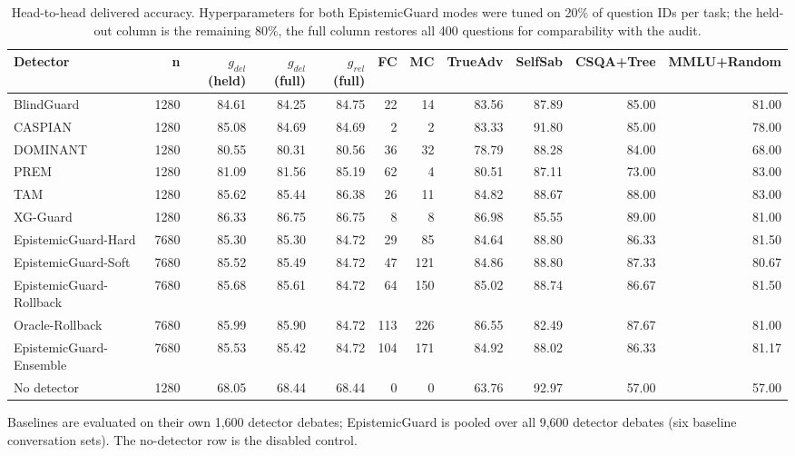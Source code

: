 \begin{table}[htbp]
\centering
\small
\caption{Head-to-head delivered accuracy. Hyperparameters for both EpistemicGuard modes were tuned on 20\% of question IDs per task; the held-out column is the remaining 80\%, the full column restores all 400 questions for comparability with the audit.}
\label{tab:leaderboard}
\begin{tabular}{lrrrrrrrrrr}
\toprule
Detector & n & $g_{del}$ (held) & $g_{del}$ (full) & $g_{rel}$ (full) & FC & MC & TrueAdv & SelfSab & CSQA+Tree & MMLU+Random \\
\midrule
BlindGuard & 1280 & 84.61 & 84.25 & 84.75 & 22 & 14 & 83.56 & 87.89 & 85.00 & 81.00 \\
CASPIAN & 1280 & 85.08 & 84.69 & 84.69 & 2 & 2 & 83.33 & 91.80 & 85.00 & 78.00 \\
DOMINANT & 1280 & 80.55 & 80.31 & 80.56 & 36 & 32 & 78.79 & 88.28 & 84.00 & 68.00 \\
PREM & 1280 & 81.09 & 81.56 & 85.19 & 62 & 4 & 80.51 & 87.11 & 73.00 & 83.00 \\
TAM & 1280 & 85.62 & 85.44 & 86.38 & 26 & 11 & 84.82 & 88.67 & 88.00 & 83.00 \\
XG-Guard & 1280 & 86.33 & 86.75 & 86.75 & 8 & 8 & 86.98 & 85.55 & 89.00 & 81.00 \\
EpistemicGuard-Hard & 7680 & 85.30 & 85.30 & 84.72 & 29 & 85 & 84.64 & 88.80 & 86.33 & 81.50 \\
EpistemicGuard-Soft & 7680 & 85.52 & 85.49 & 84.72 & 47 & 121 & 84.86 & 88.80 & 87.33 & 80.67 \\
EpistemicGuard-Rollback & 7680 & 85.68 & 85.61 & 84.72 & 64 & 150 & 85.02 & 88.74 & 86.67 & 81.50 \\
Oracle-Rollback & 7680 & 85.99 & 85.90 & 84.72 & 113 & 226 & 86.55 & 82.49 & 87.67 & 81.00 \\
EpistemicGuard-Ensemble & 7680 & 85.53 & 85.42 & 84.72 & 104 & 171 & 84.92 & 88.02 & 86.33 & 81.17 \\
No detector & 1280 & 68.05 & 68.44 & 68.44 & 0 & 0 & 63.76 & 92.97 & 57.00 & 57.00 \\
\bottomrule
\end{tabular}
\par\smallskip\footnotesize Baselines are evaluated on their own 1,600 detector debates; EpistemicGuard is pooled over all 9,600 detector debates (six baseline conversation sets). The no-detector row is the disabled control.
\end{table}
